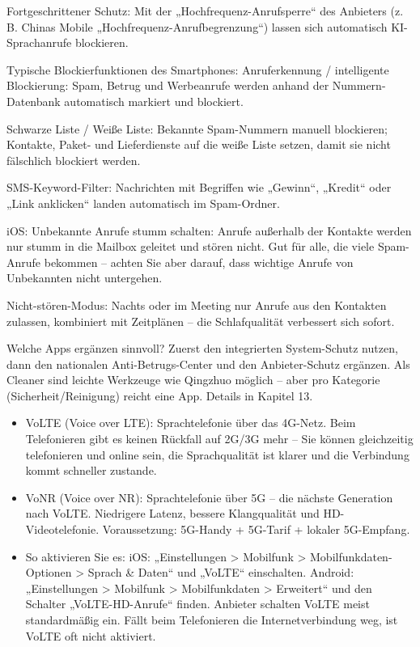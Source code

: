 Fortgeschrittener Schutz: Mit der „Hochfrequenz-Anrufsperre“ des Anbieters (z. B. Chinas Mobile „Hochfrequenz-Anrufbegrenzung“) lassen sich automatisch KI-Sprachanrufe blockieren.

Typische Blockierfunktionen des Smartphones: Anruferkennung / intelligente Blockierung: Spam, Betrug und Werbeanrufe werden anhand der Nummern-Datenbank automatisch markiert und blockiert.

Schwarze Liste / Weiße Liste: Bekannte Spam-Nummern manuell blockieren; Kontakte, Paket- und Lieferdienste auf die weiße Liste setzen, damit sie nicht fälschlich blockiert werden.

SMS-Keyword-Filter: Nachrichten mit Begriffen wie „Gewinn“, „Kredit“ oder „Link anklicken“ landen automatisch im Spam-Ordner.

iOS: Unbekannte Anrufe stumm schalten: Anrufe außerhalb der Kontakte werden nur stumm in die Mailbox geleitet und stören nicht. Gut für alle, die viele Spam-Anrufe bekommen – achten Sie aber darauf, dass wichtige Anrufe von Unbekannten nicht untergehen.

Nicht-stören-Modus: Nachts oder im Meeting nur Anrufe aus den Kontakten zulassen, kombiniert mit Zeitplänen – die Schlafqualität verbessert sich sofort.

Welche Apps ergänzen sinnvoll? Zuerst den integrierten System-Schutz nutzen, dann den nationalen Anti-Betrugs-Center und den Anbieter-Schutz ergänzen. Als Cleaner sind leichte Werkzeuge wie Qingzhuo möglich – aber pro Kategorie (Sicherheit/Reinigung) reicht eine App. Details in Kapitel 13.


\begin{itemize}
  \item VoLTE (Voice over LTE): Sprachtelefonie über das 4G-Netz. Beim Telefonieren gibt es keinen Rückfall auf 2G/3G mehr – Sie können gleichzeitig telefonieren und online sein, die Sprachqualität ist klarer und die Verbindung kommt schneller zustande.
  \item VoNR (Voice over NR): Sprachtelefonie über 5G – die nächste Generation nach VoLTE. Niedrigere Latenz, bessere Klangqualität und HD-Videotelefonie. Voraussetzung: 5G-Handy + 5G-Tarif + lokaler 5G-Empfang.
  \item So aktivieren Sie es: iOS: „Einstellungen > Mobilfunk > Mobilfunkdaten-Optionen > Sprach \& Daten“ und „VoLTE“ einschalten. Android: „Einstellungen > Mobilfunk > Mobilfunkdaten > Erweitert“ und den Schalter „VoLTE-HD-Anrufe“ finden. Anbieter schalten VoLTE meist standardmäßig ein. Fällt beim Telefonieren die Internetverbindung weg, ist VoLTE oft nicht aktiviert.
\end{itemize}

